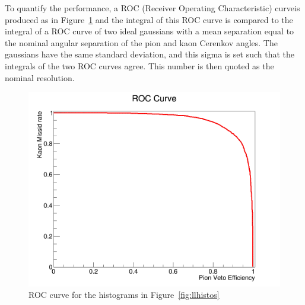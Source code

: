\documentclass[11pt]{article}
\begin{document}
To quantify the performance, a ROC (Receiver Operating Characteristic) curveis produced as in Figure~\ref{fig:roccurve} and the integral of this ROC curve is compared to the integral of a ROC curve of two ideal gaussians with a mean separation equal to the nominal angular separation of the pion and kaon Cerenkov angles. The gaussians have the same standard deviation, and this sigma is set such that the integrals of the two ROC curves agree.  This number is then quoted as the nominal resolution.
\begin{figure}
\centering
\caption{ROC curve for the histograms in Figure~\ref{fig:llhistos} \label{fig:roccurve}}
\includegraphics[width=5in]{pngs/roc_curve.png}
\end{figure}

{}

\end{document}
